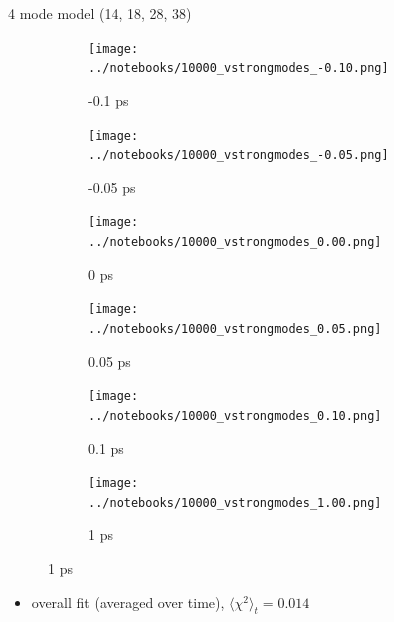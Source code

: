 \documentclass{beamer}
\newcommand\w{0.32}
\begin{document}
\begin{frame}{4 mode model (14, 18, 28, 38)}
	\begin{figure}
		\centering
		\begin{subfigure}[b]{\w\textwidth}
			\centering
			\texttt{[image: ../notebooks/10000\_vstrongmodes\_-0.10.png]}
			\caption{-0.1 ps}
		\end{subfigure}
		\begin{subfigure}[b]{\w\textwidth}
			\centering
			\texttt{[image: ../notebooks/10000\_vstrongmodes\_-0.05.png]}
			\caption{-0.05 ps}
		\end{subfigure}
		\begin{subfigure}[b]{\w\textwidth}
			\centering
			\texttt{[image: ../notebooks/10000\_vstrongmodes\_0.00.png]}
			\caption{0 ps}
		\end{subfigure}
		\begin{subfigure}[b]{\w\textwidth}
			\centering
			\texttt{[image: ../notebooks/10000\_vstrongmodes\_0.05.png]}
			\caption{0.05 ps}
		\end{subfigure}
		\begin{subfigure}[b]{\w\textwidth}
			\centering
			\texttt{[image: ../notebooks/10000\_vstrongmodes\_0.10.png]}
			\caption{0.1 ps}
		\end{subfigure}
		\begin{subfigure}[b]{\w\textwidth}
			\centering
			\texttt{[image: ../notebooks/10000\_vstrongmodes\_1.00.png]}
			\caption{1 ps}
		\end{subfigure}
	\end{figure}
\begin{itemize}
	\item overall fit (averaged over time), $\langle\chi^2\rangle_t = 0.014$
\end{itemize}
\end{frame}
\end{document}
